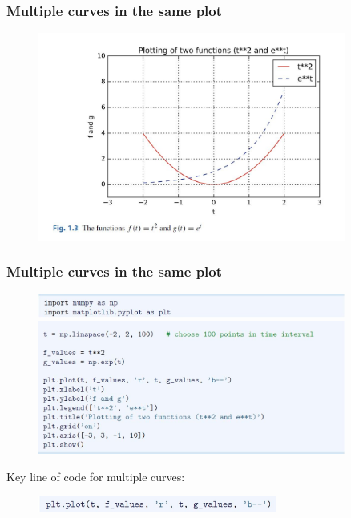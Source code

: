 \documentclass[14pt]{beamer}
\newcommand\blue[1]{{\color{blue} #1}}
\begin{document}
\begin{frame}[fragile]
\frametitle{Multiple curves in the same plot}

\begin{figure}[ht]
	\centering
	\includegraphics[width=0.9\textwidth]{figures/LLp25b}
\end{figure}

\end{frame}


\begin{frame}[fragile]
\frametitle{Multiple curves in the same plot}

\vspace*{-3mm}
\begin{figure}[ht]
	\centering
	\includegraphics[width=0.9\textwidth]{figures/LLp24b}
	\includegraphics[width=0.9\textwidth]{figures/LLp25a}
\end{figure}
\vspace*{-3mm}
Key line of code for multiple curves:

\begin{figure}[ht]
	\centering
	\includegraphics[width=0.7\textwidth]{figures/LLp25c}
\end{figure}

\end{frame}
\end{document}
